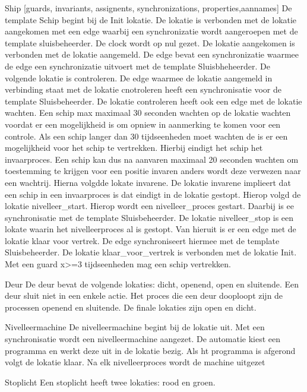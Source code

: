 \begin{thebibliography}{99}
{{Ship [guards, invariants, assignents, synchronizations, properties,aannames]
De template Schip begint bij de Init lokatie. De lokatie is verbonden met de lokatie aangekomen met een edge waarbij een synchronizatie wordt aangeroepen met de template sluisbeheerder. De clock wordt op nul gezet. De lokatie aangekomen is verbonden met de lokatie aangemeld. De edge bevat een synchronizatie waarmee de edge een synchronizatie uitvoert met de template Sluisbheheerder.
De volgende lokatie is  controleren. De edge waarmee de lokatie aangemeld in verbinding staat met de lokatie cnotroleren heeft een synchronisatie voor de template Sluisbeheerder. De lokatie controleren heeft ook een edge met de lokatie wachten. Een schip max maximaal 30 seconden wachten op de lokatie wachten voordat er een mogelijkheid is om opniew in aanmerking te komen voor een controle. Als een schip langer dan 30 tijdseenheden moet wachten de is er een mogelijkheid voor het schip te vertrekken. Hierbij eindigt het schip het invaarproces. Een schip kan dus na aanvaren maximaal 20 seconden wachten om toestemming te krijgen voor een positie invaren anders wordt deze verwezen naar een wachtrij.
Hierna volgdde lokate invarene. De lokatie invarene implieert dat een schip in een invaarproces is dat eindigt in de lokatie gestopt.
Hierop volgd de lokatie nivelleer_start. Hierop wordt een nivelleer_proces gestart. Daarbij is ee synchronisatie met de template Sluisbeheerder.
De lokatie nivelleer_stop is een lokate waarin het nivelleerproces al is gestopt. Van hieruit is er een edge met de lokatie klaar voor vertrek. De edge synchroniseert hiermee met de template Sluisbeheerder.
De lokatie klaar_voor_vertrek is verbonden met de lokatie Init. Met een guard x>=3 tijdseenheden mag een schip vertrekken.


Deur
De deur bevat de volgende lokaties: dicht, openend, open en sluitende.
Een deur sluit niet in een enkele actie. Het proces die een deur dooploopt zijn de processen openend en sluitende. De finale lokaties zijn open en dicht.

Nivelleermachine
De nivelleermachine begint bij de lokatie uit. Met een synchronisatie wordt een nivelleermachine aangezet. De automatie kiest een programma en werkt deze uit in de lokatie bezig. Als ht programma is afgerond volgt de lokatie klaar. Na elk nivelleerproces wordt de machine uitgezet

Stoplicht
Een stoplicht heeft twee lokaties: rood en groen.




}}
\end{thebibliography}
